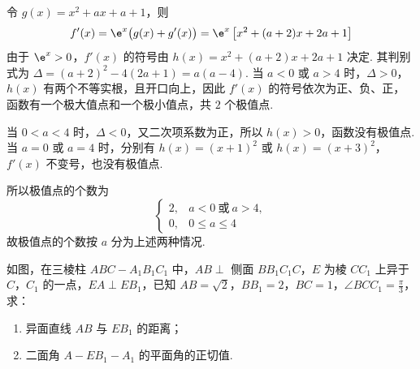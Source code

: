 \begin{solution}
令 \(g(x)=x^{2}+ax+a+1\)，则
\[
f'(x)=\e^{x}\bigl(g(x)+g'(x)\bigr)=\e^{x}\left[x^{2}+(a+2)x+2a+1\right]
\]
由于 \(\e^{x}>0\)，\(f'(x)\) 的符号由 \(h(x)=x^{2}+(a+2)x+2a+1\) 决定. 其判别式为 \(\Delta=(a+2)^{2}-4(2a+1)=a(a-4)\).
当 \(a<0\) 或 \(a>4\) 时，\(\Delta>0\)，\(h(x)\) 有两个不等实根，且开口向上，因此 \(f'(x)\) 的符号依次为正、负、正，函数有一个极大值点和一个极小值点，共 \(2\) 个极值点.

当 \(0<a<4\) 时，\(\Delta<0\)，又二次项系数为正，所以 \(h(x)>0\)，函数没有极值点. 当 \(a=0\) 或 \(a=4\) 时，分别有 \(h(x)=(x+1)^{2}\) 或 \(h(x)=(x+3)^{2}\)，
\(f'(x)\) 不变号，也没有极值点.

所以极值点的个数为
\[
\begin{cases}
2, & a<0\ \text{或}\ a>4,\\
0, & 0\leqslant a\leqslant4
\end{cases}
\]
故极值点的个数按 \(a\) 分为上述两种情况.
\end{solution}

\begin{problem}
如图，在三棱柱 \(ABC - A_{1}B_{1}C_{1}\) 中，\(AB \perp\) 侧面 \(BB_{1}C_{1}C\)，\(E\) 为棱 \(CC_{1}\) 上异于 \(C\)，\(C_{1}\) 的一点，\(EA \perp EB_{1}\)，已知 \(AB = \sqrt{2}\)，\(BB_{1} = 2\)，\(BC = 1\)，\(\angle BCC_{1} = \frac{\pi}{3}\)，求：

\begin{enumerate}
\item 异面直线 \(AB\) 与 \(EB_{1}\) 的距离；
\item 二面角 \(A - EB_{1} - A_{1}\) 的平面角的正切值.
\end{enumerate}

\end{problem}

